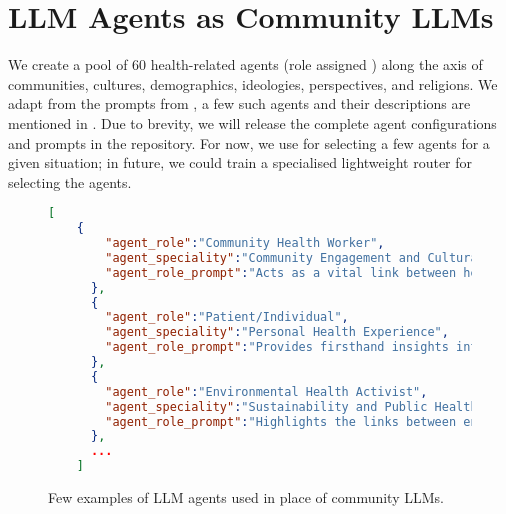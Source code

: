 \section{LLM Agents as Community LLMs}
\label{app:agents-community-LLM}
We create a pool of 60 health-related agents (role assigned \mistral) along the axis of communities, cultures, demographics, ideologies, perspectives, and religions. We adapt from the prompts from \citep{lu2024llm}, a few such agents and their descriptions are mentioned in . Due to brevity, we will release the complete agent configurations and prompts in the repository. For now, we use \gptFour for selecting a few agents for a given situation; in future, we could train a specialised lightweight router for selecting the agents.

\begin{figure}[!htp]
    \centering
    \begin{minipage}{0.95\linewidth}
    \begin{lstlisting}[language=json]
[
    {
        "agent_role":"Community Health Worker",
        "agent_speciality":"Community Engagement and Cultural Competency",
        "agent_role_prompt":"Acts as a vital link between healthcare systems and communities, helping navigate cultural nuances and build trust among patients and healthcare providers."
      },
      {
        "agent_role":"Patient/Individual",
        "agent_speciality":"Personal Health Experience",
        "agent_role_prompt":"Provides firsthand insights into symptoms, health concerns, and personal preferences that influence healthcare decisions."
      },
      {
        "agent_role":"Environmental Health Activist",
        "agent_speciality":"Sustainability and Public Health",
        "agent_role_prompt":"Highlights the links between environmental sustainability and public health, advocating for policies that protect natural and human health."
      },
      ...
    ]
    \end{lstlisting}
    \end{minipage}
    \caption{Few examples of LLM agents used in place of community LLMs.}
    \label{fig:few-agents}
\end{figure}


